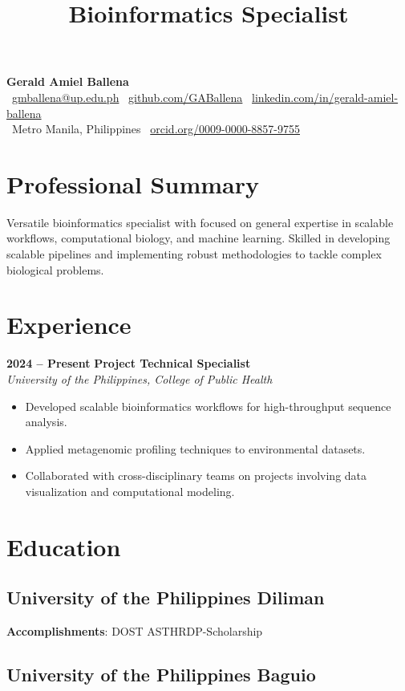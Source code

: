 \documentclass[11pt,a4paper,sans]{moderncv}
\title{Bioinformatics Specialist}
\makeatletter
\renewcommand{\makecvtitle}{
	\vspace*{-2em}
	\begin{center}
		{\Huge \textbf{Gerald Amiel Ballena}} \\[0.5em]
		\faEnvelope \ \href{mailto:gmballena@up.edu.ph}{gmballena@up.edu.ph} \quad
		\faGithub \ \href{https://github.com/GABallena}{github.com/GABallena} \quad
		\faLinkedin \ \href{https://linkedin.com/in/gerald-amiel-ballena}{linkedin.com/in/gerald-amiel-ballena} \\[0.5em]
		\faMapMarker \ Metro Manila, Philippines \quad
		\aiOrcid \ \href{https://orcid.org/0009-0000-8857-9755}{orcid.org/0009-0000-8857-9755}
	\end{center}
	\vspace{1.5em}
}
\makeatother
\begin{document}
	
	\makecvtitle
	
\section{Professional Summary}
Versatile bioinformatics specialist with  focused on general expertise in scalable workflows, computational biology, and machine learning. Skilled in developing scalable pipelines and implementing robust methodologies to tackle complex biological problems.



\section{Experience}
\textbf{2024 – Present} \hfill \textbf{Project Technical Specialist} \\
\textit{University of the Philippines, College of Public Health} \\[-1em]
\begin{itemize}
	\item Developed scalable bioinformatics workflows for high-throughput sequence analysis.
	\item Applied metagenomic profiling techniques to environmental datasets.
	\item Collaborated with cross-disciplinary teams on projects involving data visualization and computational modeling.
\end{itemize}


\section{Education}
\subsection{University of the Philippines Diliman}
\textbf{Accomplishments}: DOST ASTHRDP-Scholarship
\subsection{University of the Philippines Baguio}
\end{document}
